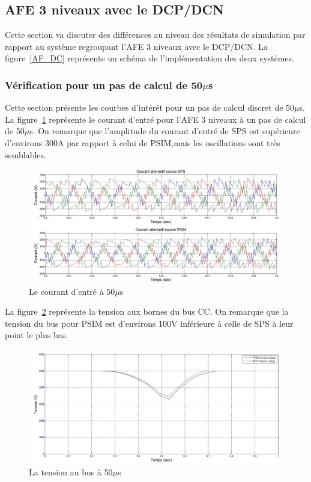 \documentclass[11pt,letterpaper,final]{report}
\begin{document}
\clearpage
\subsection{AFE 3 niveaux avec le DCP/DCN}
Cette section va discuter des différences au niveau des résultats de simulation par rapport au système regroupant l'AFE 3 niveaux avec le DCP/DCN. La figure~\ref{AF_DC} représente un schéma de l'implémentation des deux systèmes.

\subsubsection{Vérification pour un pas de calcul de 50$\mu$s}
Cette section présente les courbes d'intérêt pour un pas de calcul discret de 50$\mu$s. La figure~\ref{AF_DC_cou50} représente le courant d'entré pour l'AFE 3 niveaux à un pas de calcul de 50$\mu$s.
On remarque que l'amplitude du courant d'entré de SPS est supérieure d'environs 300A par rapport à celui de PSIM,mais les oscillations sont très semblables.

\begin{figure}[htb]
\centering
\includegraphics[scale=0.5]{Fig/DCP_AFE/50u/cour_al.jpg}
\caption{Le courant d'entré à 50$\mu$s}
\label{AF_DC_cou50}
\end{figure}

La figure~\ref{AF_DC_vch50} représente la tension aux bornes du bus CC. On remarque que la tension du bus pour PSIM est d'environs 100V inférieure à celle de SPS à leur point le plus bas.

\begin{figure}[htb]
\centering
\includegraphics[scale=0.5]{Fig/DCP_AFE/50u/ten_bus.jpg}
\caption{La tension au bus à 50$\mu$s}
\label{AF_DC_vch50}
\end{figure}
\end{document}
